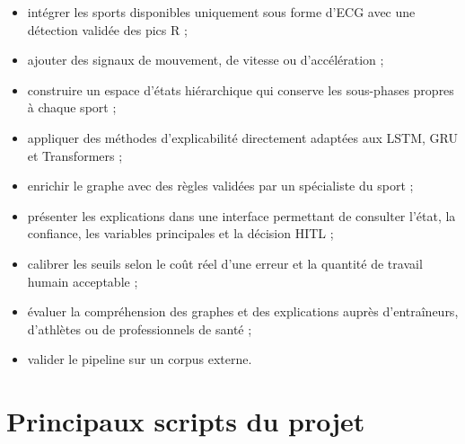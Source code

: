 \documentclass[12pt,a4paper]{article}
\begin{document}
\begin{itemize}[leftmargin=1.5em]
  \item intégrer les sports disponibles uniquement sous forme d'ECG avec une
  détection validée des pics R ;
  \item ajouter des signaux de mouvement, de vitesse ou d'accélération ;
  \item construire un espace d'états hiérarchique qui conserve les
  sous-phases propres à chaque sport ;
  \item appliquer des méthodes d'explicabilité directement adaptées aux LSTM,
  GRU et Transformers ;
  \item enrichir le graphe avec des règles validées par un spécialiste du
  sport ;
  \item présenter les explications dans une interface permettant de consulter
  l'état, la confiance, les variables principales et la décision HITL ;
  \item calibrer les seuils selon le coût réel d'une erreur et la quantité de
  travail humain acceptable ;
  \item évaluer la compréhension des graphes et des explications auprès
  d'entraîneurs, d'athlètes ou de professionnels de santé ;
  \item valider le pipeline sur un corpus externe.
\end{itemize}


\appendix

\section{Principaux scripts du projet}
\end{document}
